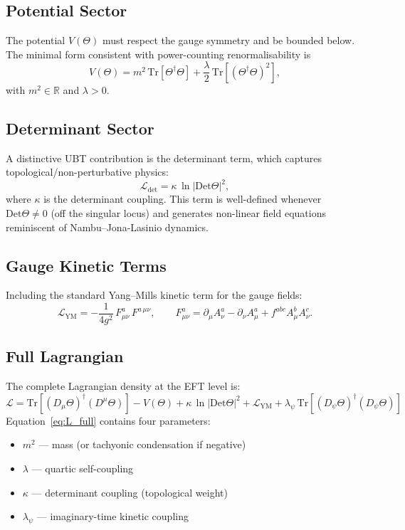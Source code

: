 \documentclass[12pt]{article}
\newcommand{\R}{\mathbb{R}}
\newcommand{\Tr}{\mathrm{Tr}}
\newcommand{\Det}{\mathrm{Det}}
\newcommand{\Lag}{\mathcal{L}}
\begin{document}
\subsection{Potential Sector}

The potential $V(\Theta)$ must respect the gauge symmetry and be bounded below.
The minimal form consistent with power-counting renormalisability is
\begin{equation}
  V(\Theta) = m^2\,\Tr\!\left[\Theta^\dagger\Theta\right]
  + \frac{\lambda}{2}\,\Tr\!\left[(\Theta^\dagger\Theta)^2\right],
  \label{eq:V_potential}
\end{equation}
with $m^2\in\R$ and $\lambda>0$.

\subsection{Determinant Sector}

A distinctive UBT contribution is the determinant term, which captures
topological/non-perturbative physics:
\begin{equation}
  \Lag_{\mathrm{det}} = \kappa\,\ln\!\left|\Det\Theta\right|^2,
  \label{eq:L_det}
\end{equation}
where $\kappa$ is the determinant coupling.  This term is well-defined whenever
$\Det\Theta\neq 0$ (off the singular locus) and generates non-linear field
equations reminiscent of Nambu--Jona-Lasinio dynamics.

\subsection{Gauge Kinetic Terms}

Including the standard Yang--Mills kinetic term for the gauge fields:
\begin{equation}
  \Lag_{\mathrm{YM}} = -\frac{1}{4g^2}\,F_{\mu\nu}^a\,F^{a\,\mu\nu},
  \qquad F_{\mu\nu}^a = \partial_\mu A_\nu^a - \partial_\nu A_\mu^a
    + f^{abc}A_\mu^b A_\nu^c.
  \label{eq:L_YM}
\end{equation}

\subsection{Full Lagrangian}

The complete Lagrangian density at the EFT level is:
\begin{equation}
  \boxed{
    \Lag = \Tr\!\left[(D_\mu\Theta)^\dagger(D^\mu\Theta)\right]
    - V(\Theta)
    + \kappa\,\ln\!\left|\Det\Theta\right|^2
    + \Lag_{\mathrm{YM}}
    + \lambda_\psi\,\Tr\!\left[(D_\psi\Theta)^\dagger(D_\psi\Theta)\right]
  }
  \label{eq:L_full}
\end{equation}
Equation~\eqref{eq:L_full} contains four parameters:
\begin{itemize}
  \item $m^2$ — mass (or tachyonic condensation if negative)
  \item $\lambda$ — quartic self-coupling
  \item $\kappa$ — determinant coupling (topological weight)
  \item $\lambda_\psi$ — imaginary-time kinetic coupling
\end{itemize}
\end{document}
